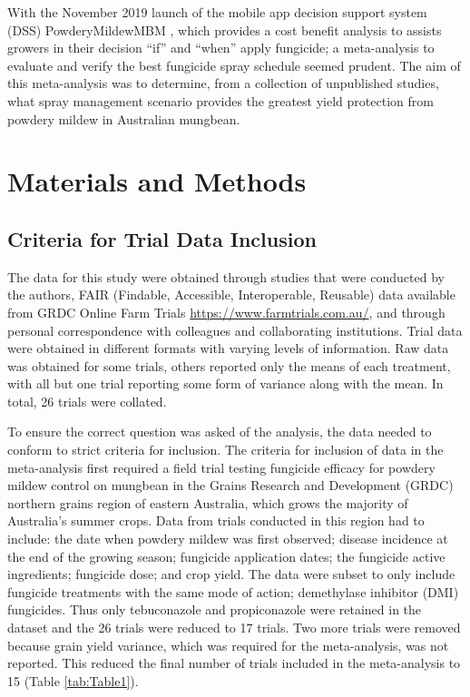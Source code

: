 \documentclass[agronomy,article,submit,moreauthors,pdftex]{mdpi}
\begin{document}
With the November 2019 launch of the mobile app decision support system (DSS) PowderyMildewMBM \citep{Diggle}, which provides a cost benefit analysis to assists growers in their decision ``if'' and ``when'' apply fungicide; a meta-analysis to evaluate and verify the best fungicide spray schedule seemed prudent.
The aim of this meta-analysis was to determine, from a collection of unpublished studies, what spray management scenario provides the greatest yield protection from powdery mildew in Australian mungbean.

\hypertarget{materials-and-methods}{%
\section{Materials and Methods}\label{materials-and-methods}}

\hypertarget{criteria-for-trial-data-inclusion}{%
\subsection{Criteria for Trial Data Inclusion}\label{criteria-for-trial-data-inclusion}}

The data for this study were obtained through studies that were conducted by the authors, FAIR (Findable, Accessible, Interoperable, Reusable) data available from GRDC Online Farm Trials \url{https://www.farmtrials.com.au/}, and through personal correspondence with colleagues and collaborating institutions.
Trial data were obtained in different formats with varying levels of information.
Raw data was obtained for some trials, others reported only the means of each treatment, with all but one trial reporting some form of variance along with the mean.
In total, 26 trials were collated.

To ensure the correct question was asked of the analysis, the data needed to conform to strict criteria for inclusion.
The criteria for inclusion of data in the meta-analysis first required a field trial testing fungicide efficacy for powdery mildew control on mungbean in the Grains Research and Development (GRDC) northern grains region of eastern Australia, which grows the majority of Australia's summer crops.
Data from trials conducted in this region had to include: the date when powdery mildew was first observed; disease incidence at the end of the growing season; fungicide application dates; the fungicide active ingredients; fungicide dose; and crop yield.
The data were subset to only include fungicide treatments with the same mode of action; demethylase inhibitor (DMI) fungicides.
Thus only tebuconazole and propiconazole were retained in the dataset and the 26 trials were reduced to 17 trials.
Two more trials were removed because grain yield variance, which was required for the meta-analysis, was not reported.
This reduced the final number of trials included in the meta-analysis to 15 (Table \ref{tab:Table1}).
\end{document}
